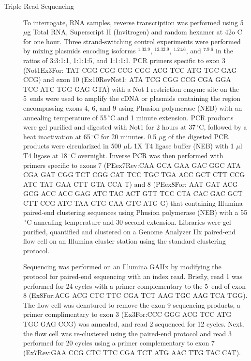 \begin{description}
		\item[Triple Read Sequencing] 
		To interrogate, RNA samples, reverse transcription was performed using 5 $\mu$g Total RNA, Superscript II (Invitrogen) and random hexamer at 42o C for one hour. Three strand-switching control experiments were performed by mixing plasmids encoding isoforms \dscam{}$^{1.33.9}$, \dscam{}$^{12.32.9}$, \dscam{}$^{1.24.6}$, and \dscam{}$^{7.9.6}$ in the ratios of 3:3:1:1, 1:1:1:5, and 1:1:1:1. PCR primers specific to exon 3 (Not1Ex3For: TAT CGG CGG CCG CGG ACG TCC ATG TGC GAG CCG) and exon 10 (Ex10RevNot1: ATA TCG CGG CCG CGA GGA TCC ATC TGG GAG GTA) with a Not I restriction enzyme site on the 5\textprime~ends were used to amplify the cDNA or plasmids containing the region encompassing exons 4, 6, and 9 using Phusion polymerase (NEB) with an annealing temperature of 55$\,^{\circ}\mathrm{C}$ and 1 minute extension. PCR products were gel purified and digested with Not1 for 2 hours at 37$\,^{\circ}\mathrm{C}$, followed by a heat inactivation at 65$\,^{\circ}\mathrm{C}$ for 20 minutes. 0.5 $\mu$g of the digested PCR products were circularized in 500 $\mu$L 1X T4 ligase buffer (NEB) with 1 $\mu$l T4 ligase at 18$\,^{\circ}\mathrm{C}$ overnight. Inverse PCR was then performed with primers specific to exons 7 (PEex7Rev:CAA GCA GAA GAC GGC ATA CGA GAT CGG TCT CGG CAT TCC TGC TGA ACC GCT CTT CCG ATC TAT GAA CTT GTA CCA T) and 8 (PEex8For: AAT GAT ACG GCG ACC ACC GAG ATC TAC ACT GTT TCC CTA CAC GAC GCT CTT CCG ATC TAA GTG CAA GTC ATG G) that containing Illumina paired-end clustering sequences using Phusion polymerase (NEB) with a 55$\,^{\circ}\mathrm{C}$ annealing temperature and 30 second extension. Libraries were gel purified, quantified and clustered on a Genome Analyzer IIx paired-end flow cell on an Illumina cluster station using the standard clustering protocol.

		Sequencing was performed on an Illumina GAIIx by modifying the protocol for paired-end sequencing with an index read. Briefly, read 1 was performed for 24 cycles with a primer complementary to the 5\textprime~end of exon 8 (Ex8For:ACG ACG CTC TTC CGA TCT AAG TGC AAG TCA TGG). The flow cell was denatured to remove the exon 9 sequencing products, a primer complimentary to exon 3 (Ex3For:CCC GGG ACG TCC ATG TGC GAG CCG) was annealed, and read 2 sequenced for 12 cycles. Next, the flow cell was re-clustered using the paired-end protocol and read 3 performed for 20 cycles using a primer complementary to exon 7 (Ex7Rev:GAA CCG CTC TTC CGA TCT ATG AAC TTG TAC CAT).


\end{description}
